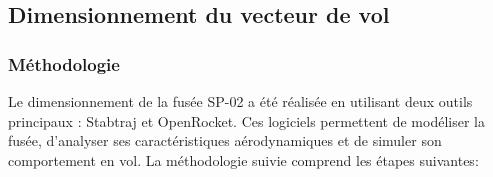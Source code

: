 \subsection{Dimensionnement du vecteur de vol}
\label{subsec:dimentionnement}

\subsubsection{Méthodologie}
\label{subsubsec:dimentionnement_methode}

Le dimensionnement de la fusée SP-02 a été réalisée en utilisant deux outils principaux : \gls{Stabtraj} et \gls{OpenRocket}. Ces
logiciels permettent de modéliser la fusée, d'analyser ses caractéristiques aérodynamiques et de simuler son comportement en vol.
La méthodologie suivie comprend les étapes suivantes:

\vspace{0.3cm}

